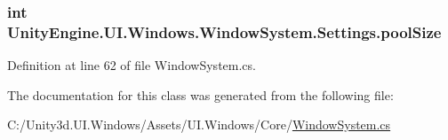 \subsubsection[{pool\+Size}]{\setlength{\rightskip}{0pt plus 5cm}int Unity\+Engine.\+U\+I.\+Windows.\+Window\+System.\+Settings.\+pool\+Size\hspace{0.3cm}{\ttfamily [get]}}\label{class_unity_engine_1_1_u_i_1_1_windows_1_1_window_system_1_1_settings_a48cdcdd60580a21f33d114921eb0780c}


Definition at line 62 of file Window\+System.\+cs.



The documentation for this class was generated from the following file\+:\begin{DoxyCompactItemize}
\item 
C\+:/\+Unity3d.\+U\+I.\+Windows/\+Assets/\+U\+I.\+Windows/\+Core/\hyperlink{_window_system_8cs}{Window\+System.\+cs}\end{DoxyCompactItemize}
